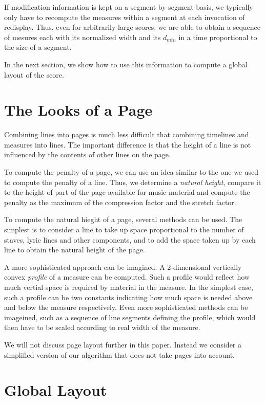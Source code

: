 \documentclass{article}
\begin{document}
If modification information is kept on a segment by segment basis,
we typically only have to recompute the measures within a segment at
each invocation of redisplay.  Thus, even for arbitrarily large
scores, we are able to obtain a sequence of mesures each with its
normalized width and its $d_{min}$ in a time proportional to the
size of a segment. 

In the next section, we show how to use this information to compute a
global layout of the score. 


\section{The Looks of a Page}

Combining lines into pages is much less difficult that combining
timelines and measures into lines.  The important difference is that
the height of a line is not influenced by the contents of other lines
on the page. 

To compute the penalty of a page, we can use an idea similar to the
one we used to compute the penalty of a line.  Thus, we determine a
\emph{natural height}, compare it to the height of part of the page
available for music material and compute the penalty as the maximum of
the compression factor and the stretch factor. 

To compute the natural hieght of a page, several methods can be used.
The simplest is to consider a line to take up space proportional to
the number of staves, lyric lines and other components, and to add the
space taken up by each line to obtain the natural height of the page. 

A more sophisticated approach can be imagined.  A 2-dimensional
vertically convex \emph{profile} of a measure can be computed.  Such a
profile would reflect how much vertial space is required by material
in the measure.  In the simplest case, such a profile can be two
constants indicating how much space is needed above and below the
measure respectively.  Even more sophisticated methods can be
imageined, such as a sequence of line segments defining the profile,
which would then have to be scaled according to real width of the
measure. 

We will not discuss page layout further in this paper.  Instead we
consider a simplified version of our algorithm that does not take
pages into account. 

\section{Global Layout}
\end{document}
